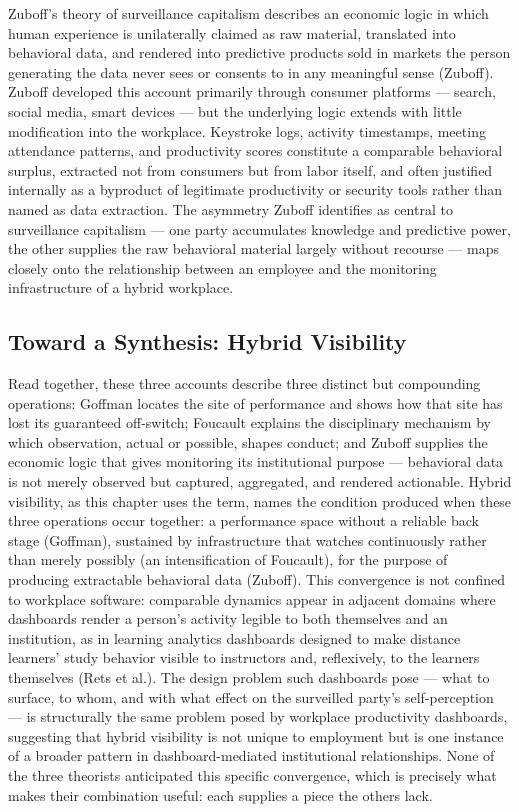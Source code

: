 \documentclass[12pt]{article}
\begin{document}
Zuboff's theory of surveillance capitalism describes an economic logic in which human experience is unilaterally claimed as raw material, translated into behavioral data, and rendered into predictive products sold in markets the person generating the data never sees or consents to in any meaningful sense (Zuboff). Zuboff developed this account primarily through consumer platforms --- search, social media, smart devices --- but the underlying logic extends with little modification into the workplace. Keystroke logs, activity timestamps, meeting attendance patterns, and productivity scores constitute a comparable behavioral surplus, extracted not from consumers but from labor itself, and often justified internally as a byproduct of legitimate productivity or security tools rather than named as data extraction. The asymmetry Zuboff identifies as central to surveillance capitalism --- one party accumulates knowledge and predictive power, the other supplies the raw behavioral material largely without recourse --- maps closely onto the relationship between an employee and the monitoring infrastructure of a hybrid workplace.

\subsection{Toward a Synthesis: Hybrid Visibility}

Read together, these three accounts describe three distinct but compounding operations: Goffman locates the site of performance and shows how that site has lost its guaranteed off-switch; Foucault explains the disciplinary mechanism by which observation, actual or possible, shapes conduct; and Zuboff supplies the economic logic that gives monitoring its institutional purpose --- behavioral data is not merely observed but captured, aggregated, and rendered actionable. Hybrid visibility, as this chapter uses the term, names the condition produced when these three operations occur together: a performance space without a reliable back stage (Goffman), sustained by infrastructure that watches continuously rather than merely possibly (an intensification of Foucault), for the purpose of producing extractable behavioral data (Zuboff). This convergence is not confined to workplace software: comparable dynamics appear in adjacent domains where dashboards render a person's activity legible to both themselves and an institution, as in learning analytics dashboards designed to make distance learners' study behavior visible to instructors and, reflexively, to the learners themselves (Rets et al.). The design problem such dashboards pose --- what to surface, to whom, and with what effect on the surveilled party's self-perception --- is structurally the same problem posed by workplace productivity dashboards, suggesting that hybrid visibility is not unique to employment but is one instance of a broader pattern in dashboard-mediated institutional relationships. None of the three theorists anticipated this specific convergence, which is precisely what makes their combination useful: each supplies a piece the others lack.
\end{document}
